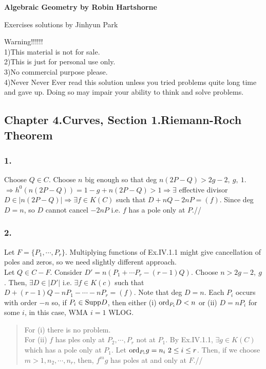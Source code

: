 \documentclass[12pt]{amsart}           %
\begin{document}
\begin{center}
\bf
\large Algebraic Geometry by Robin Hartshorne\\
\end{center}
\begin{center}
Exercises solutions by Jinhyun Park\\
\end{center}
\vskip1cm
Warning!!!!!!\\
1)This material is not for sale.\\
2)This is just for personal use only.\\
3)No commercial purpose please.\\
4)Never Never Ever read this solution unless you tried problems quite long time and gave up. Doing so may impair your ability to think and solve problems.\\

\vskip1.5cm

\subsection*{ Chapter 4.Curves, Section 1.Riemann-Roch Theorem}

\subsubsection*{ 1.} 
Choose $Q \in C$. Choose $n$ big enough so that deg $n(2P-Q) > 2g-2,\ g,\ 1$. $\Rightarrow h^0 (n(2P-Q)) = 1-g+n(2P-Q) >1 \Rightarrow \exists$ effective divisor $D \in |n(2P-Q)| \Rightarrow \exists f \in K(C)$ such that $D+nQ-2nP = (f)$. Since deg $D=n$, so $D$ cannot cancel $-2nP$ i.e. $f$ has a pole only at $P$.//

\subsubsection*{ 2.}

 Let $F=\{P_1 , \cdots , P_r\}$. Multiplying functions of Ex.IV.1.1 might give cancellation of poles and zeros, so we need slightly different approach.\\
Let $Q \in C-F$. Consider $D'=n(P_1 + \cdots P_r - (r-1)Q)$. Choose $n > 2g-2,\ g$. Then, $\exists D \in |D'|$ i.e. $\exists f\in K(c)$ such that $D+(r-1)Q - nP_1 - \cdots -nP_r = (f)$. Note that deg $D = n$. Each $P_i$ occurs with order $-n$ so, if $P_i \in {\rm Supp} D$, then either (i) ${\rm ord}_{P_i} D <n$ or (ii) $D= nP_i$ for some $i$, in this case, WMA $i=1$ WLOG.
\begin{quote}
For (i) there is no problem.\\
For (ii) $f$ has ples only at $P_2, \cdots, P_r$ not at $P_1$. By Ex.IV.1.1, $\exists g \in K(C)$ which has a pole only at $P_1$. Let ${\rm ord}_{P_i} g = n_i \ 2 \leq i \leq r$. Then, if we choose $m > 1, n_2, \cdots, n_r$, then, $f^m g$ has poles at and only at $F$.//
\end{quote}
\end{document}
